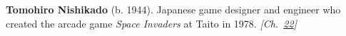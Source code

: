 \textbf{Tomohiro Nishikado} (b. 1944). Japanese game designer and engineer who created the arcade game \emph{Space Invaders} at Taito in 1978. \emph{[Ch.~\hyperref[ch:minecraftcreeper]{22}]}

